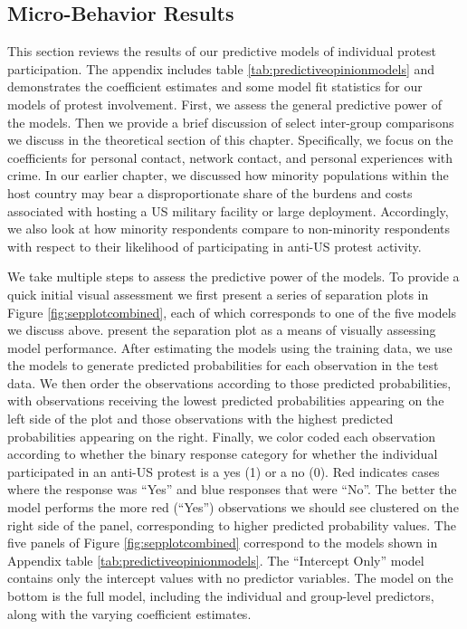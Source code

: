 \subsection*{Micro-Behavior Results}

This section reviews the results of our predictive models of individual protest participation. The appendix includes table \ref{tab:predictiveopinionmodels} and demonstrates the coefficient estimates and some model fit statistics for our models of protest involvement. First, we assess the general predictive power of the models. Then we provide a brief discussion of select inter-group comparisons we discuss in the theoretical section of this chapter. Specifically, we focus on the coefficients for personal contact, network contact, and personal experiences with crime. In our earlier chapter, we discussed how minority populations within the host country may bear a disproportionate share of the burdens and costs associated with hosting a US military facility or large deployment. Accordingly, we also look at how minority respondents compare to non-minority respondents with respect to their likelihood of participating in anti-US protest activity.




We take multiple steps to assess the predictive power of the models. To provide a quick initial visual assessment we first present a series of separation plots in Figure \ref{fig:sepplotcombined}, each of which corresponds to one of the five models we discuss above.  present the separation plot as a means of visually assessing model performance. After estimating the models using the training data, we use the models to generate predicted probabilities for each observation in the test data. We then order the observations according to those predicted probabilities, with observations receiving the lowest predicted probabilities appearing on the left side of the plot and those observations with the highest predicted probabilities appearing on the right. Finally, we color coded each observation according to whether the binary response category for whether the individual participated in an anti-US protest is a yes (1) or a no (0).  Red indicates cases where the response was ``Yes'' and blue responses that were ``No''. The better the model performs the more red (``Yes'') observations we should see clustered on the right side of the panel, corresponding to higher predicted probability values. The five panels of Figure \ref{fig:sepplotcombined} correspond to the models shown in Appendix table \ref{tab:predictiveopinionmodels}. The ``Intercept Only'' model contains only the intercept values with no predictor variables. The model on the bottom is the full model, including the individual and group-level predictors, along with the varying coefficient estimates.

